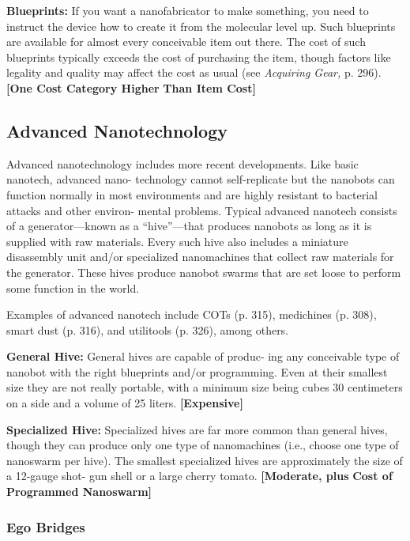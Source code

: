 \textbf{Blueprints:} If you want a nanofabricator to make 
something, you need to instruct the device how to 
create it from the molecular level up. Such blueprints 
are available for almost every conceivable item out 
there. The cost of such blueprints typically exceeds 
the cost of purchasing the item, though factors like 
legality and quality may affect the cost as usual (see 
\textit{Acquiring Gear,} p. 296). \textbf{[One Cost Category Higher }
\textbf{Than Item Cost]}

\subsection{Advanced Nanotechnology}

Advanced nanotechnology includes more recent 
developments. Like basic nanotech, advanced nano-
technology cannot self-replicate but the nanobots 
can function normally in most environments and are 
highly resistant to bacterial attacks and other environ-
mental problems. Typical advanced nanotech consists 
of a generator—known as a ``hive''—that produces 
nanobots as long as it is supplied with raw materials. 
Every such hive also includes a miniature disassembly 
unit and/or specialized nanomachines that collect 
raw materials for the generator. These hives produce 
nanobot swarms that are set loose to perform some 
function in the world.

Examples of advanced nanotech include COTs (p. 
315), medichines (p. 308), smart dust (p. 316), and 
utilitools (p. 326), among others.

\textbf{General Hive:} General hives are capable of produc-
ing any conceivable type of nanobot with the right 
blueprints and/or programming. Even at their smallest 
size they are not really portable, with a minimum size 
being cubes 30 centimeters on a side and a volume of 
25 liters. \textbf{[Expensive]}

\textbf{Specialized Hive:} Specialized hives are far more 
common than general hives, though they can produce 
only one type of nanomachines (i.e., choose one type 
of nanoswarm per hive). The smallest specialized 
hives are approximately the size of a 12-gauge shot-
gun shell or a large cherry tomato. \textbf{[Moderate, plus }
\textbf{Cost of Programmed Nanoswarm]}

\subsubsection{Ego Bridges}

